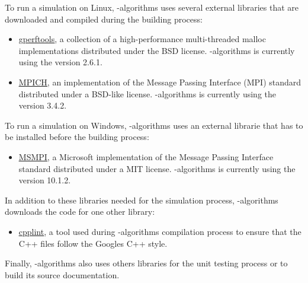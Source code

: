 \documentclass[a4paper, 12pt]{report}
\begin{document}
To run a simulation on Linux, \Dynawo-algorithms uses several external libraries that are downloaded and compiled during the building process:
\begin{itemize}
\item \href{https://github.com/gperftools/gperftools} {\underline{gperftools}}, a collection of a high-performance multi-threaded
malloc implementations distributed under the BSD license. \Dynawo-algorithms is currently using the version 2.6.1.

\item \href{https://www.mpich.org/}{\underline{MPICH}}, an implementation of the Message Passing Interface (MPI) standard distributed under a BSD-like license. 
\Dynawo-algorithms is currently using the version 3.4.2.
\end{itemize}

To run a simulation on Windows, \Dynawo-algorithms uses an external librarie that has to be installed before the building process:
\begin{itemize}
\item \href{https://learn.microsoft.com/en-us/message-passing-interface/microsoft-mpi?redirectedfrom=MSDN}{\underline{MSMPI}}, a Microsoft implementation of the Message Passing Interface standard distributed under a MIT license.
\Dynawo-algorithms is currently using the version 10.1.2.
\end{itemize}

In addition to these libraries needed for the simulation process, \Dynawo-algorithms downloads the code for one other library:
\begin{itemize}
\item \href{https://github.com/cpplint/cpplint}{\underline{cpplint}}, 
a tool used during \Dynawo-algorithms compilation process to ensure that the C++ files follow the Google\textquotesingle s C++ style.
\end{itemize}

Finally, \Dynawo-algorithms also uses others libraries for the unit testing process or to build its source documentation. 
\end{document}
